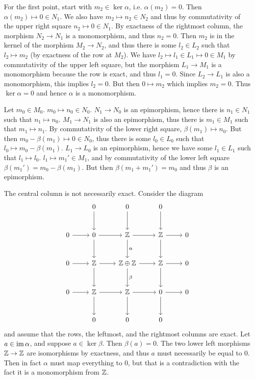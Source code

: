 \begin{solution}
	For the first point, start with $m_2 \in \ker \alpha$, i.e. $\alpha(m_2) = 0$. Then $\alpha(m_2) \mapsto 0 \in N_1$. We also have $m_2 \mapsto n_2 \in N_2$ and thus by commutativity of the upper right square $n_2 \mapsto 0 \in N_1$. By exactness of the rightmost column, the morphism $N_2 \to N_1$ is a monomorphism, and thus $n_2 = 0$. Then $m_2$ is in the kernel of the morphism $M_2 \to N_2$, and thus there is some $l_2 \in L_2$ such that $l_2 \mapsto m_2$ (by exactness of the row at $M_2$). We have $l_2 \mapsto l_1 \in L_1 \mapsto 0 \in M_1$ by commutativity of the upper left square, but the morphism $L_1 \to M_1$ is a monomorphism because the row is exact, and thus $l_1 = 0$. Since $L_2 \to L_1$ is also a monomorphism, this implies $l_2 = 0$. But then $0 \mapsto m_2$ which implies $m_2 = 0$. Thus $\ker \alpha = 0$ and hence $\alpha$ is a monomorphism.
	
	Let $m_0 \in M_0$. $m_0 \mapsto n_0 \in N_0$. $N_1 \to N_0$ is an epimorphism, hence there is $n_1 \in N_1$ such that $n_1 \mapsto n_0$. $M_1 \to N_1$ is also an epimorphism, thus there is $m_1 \in M_1$ such that $m_1 \mapsto n_1$. By commutativity of the lower right square, $\beta(m_1) \mapsto n_0$. But then $m_0 - \beta(m_1) \mapsto 0 \in N_0$, thus there is some $l_0 \in L_0$ such that $l_0 \mapsto m_0 - \beta(m_1)$. $L_1 \to L_0$ is an epimorphism, hence we have some $l_1 \in L_1$ such that $l_1 \mapsto l_0$. $l_1 \mapsto m_1' \in M_1$, and by commutativity of the lower left square $\beta(m_1') = m_0 - \beta(m_1)$. But then $\beta(m_1 + m_1') = m_0$ and thus $\beta$ is an epimorphism.
	
	The central column is not necessarily exact. Consider the diagram
	\[
		\begin{tikzcd}[row sep=large]
			& 0
			\arrow[d]
			& 0
			\arrow[d]
			& 0
			\arrow[d]
			& \\
			0
			\arrow[r]
			& 0
			\arrow[r]
			\arrow[d]
			& \Zs
			\arrow[r]
			\arrow[d, "\alpha"]
			& \Zs
			\arrow[r]
			\arrow[d]
			& 0 \\
			0
			\arrow[r]
			& \Zs
			\arrow[r]
			\arrow[d]
			& \Zs \oplus \Zs
			\arrow[r]
			\arrow[d, "\beta"]
			& \Zs
			\arrow[r]
			\arrow[d]
			& 0 \\
			0
			\arrow[r]
			& \Zs
			\arrow[r]
			\arrow[d]
			& \Zs
			\arrow[r]
			\arrow[d]
			& 0
			\arrow[r]
			\arrow[d]
			& 0 \\
			& 0
			& 0
			& 0
		\end{tikzcd}
	\]
	and assume that the rows, the leftmost, and the rightmost columns are exact. Let $a \in \operatorname{im} \alpha$, and suppose $a \in \ker \beta$. Then $\beta(a) = 0$. The two lower left morphisms $\mathbb{Z} \to \mathbb{Z}$ are isomorphisms by exactness, and thus $a$ must necessarily be equal to $0$. Then in fact $\alpha$ must map everything to $0$, but that is a contradiction with the fact it is a monomorphism from $\mathbb{Z}$.
	

\end{solution}
